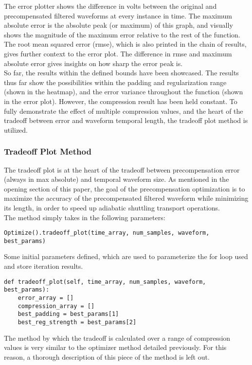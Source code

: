 \documentclass[11pt, a4paper]{article}
\theoremstyle{definition}
\numberwithin{equation}{section}
\begin{document}
The error plotter shows the difference in volts between the original and precompensated filtered waveforms at every instance in time. The maximum absolute error is the absolute peak (or maximum) of this graph, and visually shows the magnitude of the maximum error relative to the rest of the function. The root mean squared error (rmse), which is also printed in the chain of results, gives further context to the error plot. The difference in rmse and maximum absolute error gives insights on how sharp the error peak is. 
\\
So far, the results within the defined bounds have been showcased. The results thus far show the possibilities within the padding and regularization range (shown in the heatmap), and the error variance throughout the function (shown in the error plot). However, the compression result has been held constant. To fully demonstrate the effect of multiple compression values, and the heart of the tradeoff between error and waveform temporal length, the tradeoff plot method is utilized.

\subsubsection{Tradeoff Plot Method}

The tradeoff plot is at the heart of the tradeoff between precompensation error (always in max absolute) and temporal waveform size. As mentioned in the opening section of this paper, the goal of the precompensation optimization is to maximize the accuracy of the precompensated filtered waveform while minimizing its length, in order to speed up adiabatic shuttling transport operations.
\\
The method simply takes in the following parameters:

\begin{verbatim}
Optimize().tradeoff_plot(time_array, num_samples, waveform, best_params)
\end{verbatim}

Some initial parameters defined, which are used to parameterize the for loop used and store iteration results.

\begin{verbatim}
def tradeoff_plot(self, time_array, num_samples, waveform, best_params):
    error_array = []
    compression_array = []
    best_padding = best_params[1]
    best_reg_strength = best_params[2]
\end{verbatim}

The method by which the tradeoff is calculated over a range of compression values is very similar to the optimizer method detailed previously. For this reason, a thorough description of this piece of the method is left out.
\end{document}
